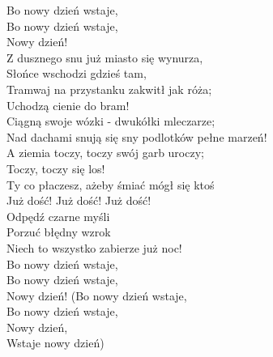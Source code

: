 \begin{flushleft}
\hspace{1.8cm}Bo nowy dzień wstaje, \\
\hspace{1.8cm}Bo nowy dzień wstaje, \\
\hspace{1.8cm}Nowy dzień! \\
\vskip 3mm
Z dusznego snu już miasto się wynurza, \\
Słońce wschodzi gdzieś tam, \\
Tramwaj na przystanku zakwitł jak róża; \\
Uchodzą cienie do bram! \\
Ciągną swoje wózki - dwukółki mleczarze; \\
Nad dachami snują się sny podlotków pełne marzeń! \\
\vskip 3mm
\hspace{0.9cm}A ziemia toczy, toczy swój garb uroczy; \\
\hspace{0.9cm}Toczy, toczy się los! \\
\hspace{0.9cm}Ty co płaczesz, ażeby śmiać mógł się ktoś \\
\hspace{0.9cm}Już dość! Już dość! Już dość! \\
\hspace{0.9cm}Odpędź czarne myśli \\
\hspace{0.9cm}Porzuć błędny wzrok \\
\hspace{0.9cm}Niech to wszystko zabierze już noc! \\
\hspace{1.8cm}Bo nowy dzień wstaje, \tab{$\mid$} \\
\hspace{1.8cm}Bo nowy dzień wstaje, \tab{$\mid$}\\
\hspace{1.8cm}Nowy dzień! \tab{}
\vskip 3mm
\hspace{1.8cm}(Bo nowy dzień wstaje, \\
\hspace{1.8cm}Bo nowy dzień wstaje, \\
\hspace{1.8cm}Nowy dzień, \\
\hspace{1.8cm}Wstaje nowy dzień) \\
\end{flushleft}
\clearpage
